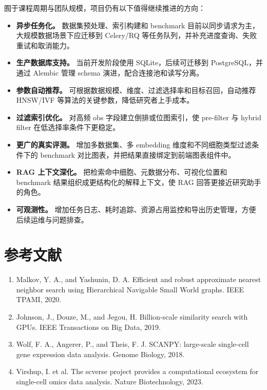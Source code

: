 \documentclass[UTF8,a4paper,12pt]{ctexrep}
\begin{document}
囿于课程周期与团队规模，项目仍有以下值得继续推进的方向：

\begin{itemize}
  \item \textbf{异步任务化。} 数据集预处理、索引构建和 benchmark 目前以同步请求为主，大规模数据场景下应迁移到 Celery/RQ 等任务队列，并补充进度查询、失败重试和取消能力。
  \item \textbf{生产数据库支持。} 当前开发阶段使用 SQLite，后续可迁移到 PostgreSQL，并通过 Alembic 管理 schema 演进，配合连接池和读写分离。
  \item \textbf{参数自动推荐。} 可根据数据规模、维度、过滤选择率和目标召回，自动推荐 HNSW/IVF 等算法的关键参数，降低研究者上手成本。
  \item \textbf{过滤索引优化。} 对高频 obs 字段建立倒排或位图索引，使 pre-filter 与 hybrid filter 在低选择率条件下更稳定。
  \item \textbf{更广的真实评测。} 增加多数据集、多 embedding 维度和不同细胞类型过滤条件下的 benchmark 对比图表，并把结果直接绑定到前端图表组件中。
  \item \textbf{RAG 上下文深化。} 把检索命中细胞、元数据分布、可视化位置和 benchmark 结果组织成更结构化的解释上下文，使 RAG 回答更接近研究助手的角色。
  \item \textbf{可观测性。} 增加任务日志、耗时追踪、资源占用监控和导出历史管理，方便后续运维与问题排查。
\end{itemize}

\chapter*{参考文献}

\begin{enumerate}
  \item Malkov, Y. A., and Yashunin, D. A. Efficient and robust approximate nearest neighbor search using Hierarchical Navigable Small World graphs. IEEE TPAMI, 2020.
  \item Johnson, J., Douze, M., and Jegou, H. Billion-scale similarity search with GPUs. IEEE Transactions on Big Data, 2019.
  \item Wolf, F. A., Angerer, P., and Theis, F. J. SCANPY: large-scale single-cell gene expression data analysis. Genome Biology, 2018.
  \item Virshup, I. et al. The scverse project provides a computational ecosystem for single-cell omics data analysis. Nature Biotechnology, 2023.
\end{enumerate}
\end{document}
